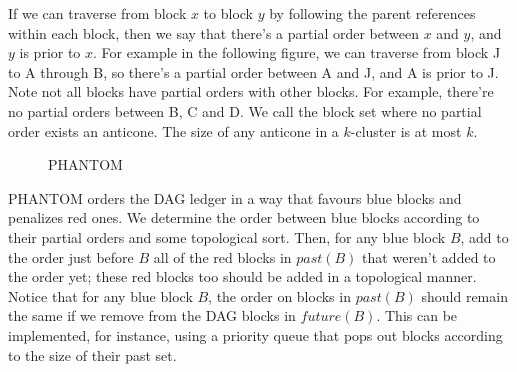 \documentclass[a4paper,11pt]{article}
\begin{document}
If we can traverse from block $x$ to block $y$ by following the parent
references within each block, then we say that there's a partial order between
$x$ and $y$, and $y$ is prior to $x$. For example in the following figure, we
can traverse from block J to A through B, so there's a partial order between A
and J, and A is prior to J. Note not all blocks have partial orders with other
blocks. For example, there're no partial orders between B, C and D. We call the
block set where no partial order exists an anticone. The size of any anticone in
a $k$-cluster is at most $k$.

\begin{figure}[h]
	\centerline{%
	}
\caption{PHANTOM}
\end{figure}


PHANTOM orders the DAG ledger in a way that favours blue blocks and penalizes
red ones. We determine the order between blue blocks according to their partial
orders and some topological sort. Then, for any blue block $B$, add to the order
just before $B$ all of the red blocks in $past(B)$ that weren’t added to the
order yet; these red blocks too should be added in a topological manner. Notice
that for any blue block $B$, the order on blocks in $past(B)$ should remain the
same if we remove from the DAG blocks in $future(B)$. This can be implemented,
for instance, using a priority queue that pops out blocks according to the size
of their past set.
\end{document}
